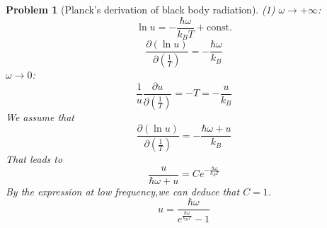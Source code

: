 \documentclass{article}
\theoremstyle{t}
\newtheorem{problem}{Problem}
\newcommand{\pa}{\partial}
\begin{document}
\begin{problem}[Planck’s derivation of black body radiation]
    (1) $\omega \rightarrow +\infty$:
    \begin{equation}
        \ln u=-\frac{\hbar \omega}{k_B T}+\mathrm{const.}
    \end{equation}
    \begin{equation}
        \frac{\pa (\ln u)}{\pa\left(\frac{1}{T}\right)}=-\frac{\hbar \omega}{k_B}
    \end{equation}
    \qquad $\omega\rightarrow 0$:
    \begin{equation}
        \frac{1}{u}\frac{\pa u}{\pa\left(\frac{1}{T}\right)}=-T=-\frac{u}{k_B}
    \end{equation}
    We assume that 
    \begin{equation}
        \frac{\pa(\ln u)}{\pa \left(\frac{1}{T}\right)}=-\frac{\hbar \omega +u}{k_B}
    \end{equation}
    That leads to 
    \begin{equation}
        \frac{u}{\hbar \omega +u}=Ce^{-\frac{\hbar \omega}{k_B T}}
    \end{equation}
    By the expression at low frequency,we can deduce that $C=1$.
    \begin{equation}
        u=\frac{\hbar \omega}{e^{\frac{\hbar \omega}{k_B T}}-1}
    \end{equation}
\end{problem}
\end{document}
